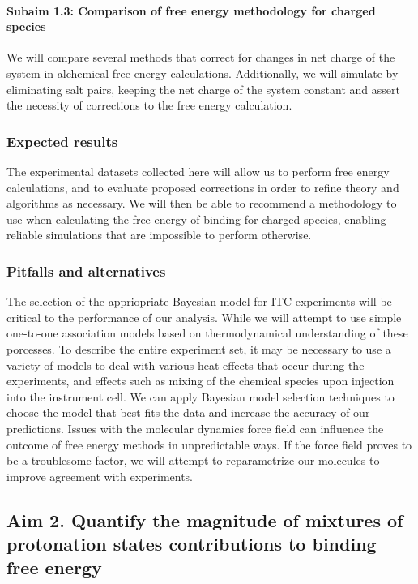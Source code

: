 \documentclass[10pt]{article}
\newcommand{\subsubsubsection}[1]{\paragraph*{#1}}
\begin{document}
\subsubsubsection{Subaim 1.3: Comparison of free energy methodology for charged species}
We will compare several methods that correct for changes in net charge of the system in alchemical free energy calculations\cite{Reif2013a,Rocklin2013a}. Additionally, we will simulate by eliminating salt pairs, keeping the net charge of the system constant and assert the necessity of corrections to the free energy calculation.
 
\subsubsection*{Expected results}
The experimental datasets collected here will allow us to perform free energy calculations, and to evaluate proposed corrections in order to refine theory and algorithms as necessary. We will then be able to recommend a methodology to use when calculating the free energy of binding for charged species, enabling reliable simulations that are impossible to perform otherwise.
\subsubsection*{Pitfalls and alternatives}
The selection of the appriopriate Bayesian model for ITC experiments will be critical to the performance of our analysis. While we will attempt to use simple one-to-one association models based on thermodynamical understanding of these porcesses. To describe the entire experiment set, it may be necessary to use a variety of models to deal with various heat effects that occur during the experiments, and effects such as mixing of the chemical species upon injection into the instrument cell. We can apply Bayesian model selection techniques to choose the model that best fits the data and increase the accuracy of our predictions.
Issues with the molecular dynamics force field can influence the outcome of free energy methods in unpredictable ways. If the force field proves to be a troublesome factor, we will attempt to reparametrize our molecules to improve agreement with experiments.

\subsection*{Aim 2. Quantify the magnitude of mixtures of protonation states contributions to binding free energy}
\end{document}
